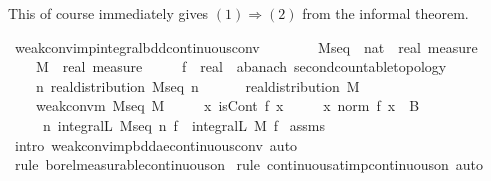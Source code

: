 \documentclass{article}
\theoremstyle{definition}
\begin{document}
\medskip

This of course immediately gives $(1) \Rightarrow (2)$ from the informal theorem.

\medskip

\begin{isabellebody}
\isamarkupfalse%
\ weak{\isacharunderscore}conv{\isacharunderscore}imp{\isacharunderscore}integral{\isacharunderscore}bdd{\isacharunderscore}continuous{\isacharunderscore}conv{\isacharcolon}\isanewline
\ \ \ \isanewline
\ \ \ \ M{\isacharunderscore}seq\ {\isacharcolon}{\isacharcolon}\ {\isachardoublequoteopen}nat\ {\isasymRightarrow}\ real\ measure{\isachardoublequoteclose}\ \isanewline
\ \ \ \ M\ {\isacharcolon}{\isacharcolon}\ {\isachardoublequoteopen}real\ measure{\isachardoublequoteclose}\ \isanewline
\ \ \ \ f\ {\isacharcolon}{\isacharcolon}\ {\isachardoublequoteopen}real\ {\isasymRightarrow}\ {\isacharprime}a{\isacharcolon}{\isacharcolon}{\isacharbraceleft}banach{\isacharcomma}\ second{\isacharunderscore}countable{\isacharunderscore}topology{\isacharbraceright}{\isachardoublequoteclose}\isanewline
\ \ \ \isanewline
\ \ \ \ {\isachardoublequoteopen}{\isasymAnd}n{\isachardot}\ real{\isacharunderscore}distribution\ {\isacharparenleft}M{\isacharunderscore}seq\ n{\isacharparenright}{\isachardoublequoteclose}\ \ \isanewline
\ \ \ \ {\isachardoublequoteopen}real{\isacharunderscore}distribution\ M{\isachardoublequoteclose}\ \ \isanewline
\ \ \ \ {\isachardoublequoteopen}weak{\isacharunderscore}conv{\isacharunderscore}m\ M{\isacharunderscore}seq\ M{\isachardoublequoteclose}\ \isanewline
\ \ \ \ {\isachardoublequoteopen}{\isasymAnd}x{\isachardot}\ isCont\ f\ x{\isachardoublequoteclose}\ \isanewline
\ \ \ \ {\isachardoublequoteopen}{\isasymAnd}x{\isachardot}\ norm\ {\isacharparenleft}f\ x{\isacharparenright}\ {\isasymle}\ B{\isachardoublequoteclose}\isanewline
\ \ \ \isanewline
\ \ \ \ {\isachardoublequoteopen}{\isacharparenleft}{\isasymlambda}\ n{\isachardot}\ integral\isactrlsup L\ {\isacharparenleft}M{\isacharunderscore}seq\ n{\isacharparenright}\ f{\isacharparenright}\ {\isacharminus}{\isacharminus}{\isacharminus}{\isacharminus}{\isachargreater}\ integral\isactrlsup L\ M\ f{\isachardoublequoteclose}\isanewline
{}\isamarkupfalse%
\ assms\ \isamarkupfalse%
\ {\isacharparenleft}intro\ weak{\isacharunderscore}conv{\isacharunderscore}imp{\isacharunderscore}bdd{\isacharunderscore}ae{\isacharunderscore}continuous{\isacharunderscore}conv{\isacharcomma}\ auto{\isacharparenright}\isanewline
\ \ \isamarkupfalse%
\ {\isacharparenleft}rule\ borel{\isacharunderscore}measurable{\isacharunderscore}continuous{\isacharunderscore}on{}{\isacharparenright}\isanewline
{}\isamarkupfalse%
\ {\isacharparenleft}rule\ continuous{\isacharunderscore}at{\isacharunderscore}imp{\isacharunderscore}continuous{\isacharunderscore}on{\isacharcomma}\ auto{\isacharparenright}%
\end{isabellebody}
\end{document}
